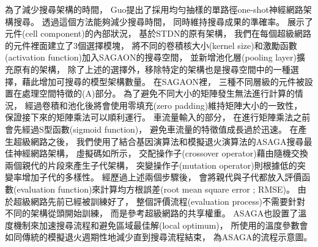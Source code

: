\documentclass[a4paper,14pt]{extarticle}
\begin{document}
            為了減少搜尋架構的時間，
            Guo\cite{guo2020single}提出了採用均勻抽樣的單路徑one-shot神經網路架構搜尋。
            透過這個方法能夠減少搜尋時間，
            同時維持搜尋成果的準確率。
            展示了元件(cell component)的內部狀況，
            基於STDN的原有架構，
            我們在每個超級網路的元件裡面建立了3個選擇模塊，
            將不同的卷積核大小(kernel size)和激勵函數(activation function)加入SAGAON的搜尋空間，
            並新增池化層(pooling layer)擴充原有的架構，
            除了上述的選擇外，移除特定的架構也是搜尋空間中的一種選擇，藉此增加可搜尋的模型架構數量。
            在SAGAON裡，
            三種不同層級的元件被設置在處理空間特徵的(A)部分。
            為了避免不同大小的矩陣發生無法進行計算的情況，
            經過卷積和池化後將會使用零填充(zero padding)維持矩陣大小的一致性，
            保證接下來的矩陣乘法可以順利運行。
            車流量輸入的部分，
            在進行矩陣乘法之前會先經過S型函數(sigmoid function)，
            避免車流量的特徵值成長過於迅速。
            在產生超級網路之後，
            我們使用了結合基因演算法和模擬退火演算法的ASAGA搜尋最佳神經網路架構，
            虛擬碼如所示，
            交配操作子(crossover operator)藉由隨機交換兩個親代的片段來產生子代架構，
            突變操作子(mutation operator)則根據低的突變率增加子代的多樣性。
            經歷過上述兩個步驟後，
            會將親代與子代都放入評價函數(evaluation function)來計算均方根誤差(root mean square error ; RMSE)。
            由於超級網路先前已經被訓練好了，
            整個評價流程(evaluation process)不需要針對不同的架構從頭開始訓練，
            而是參考超級網路的共享權重。
            ASAGA也設置了溫度機制來加速搜尋流程和避免區域最佳解(local optimum)，
            所使用的溫度參數會如同傳統的模擬退火週期性地減少直到搜尋流程結束，
            為ASAGA的流程示意圖。

            \renewcommand{\algorithmicrequire}{\textbf{Input:}}  %
            \renewcommand{\algorithmicensure}{\textbf{Output:}} %
\end{document}
